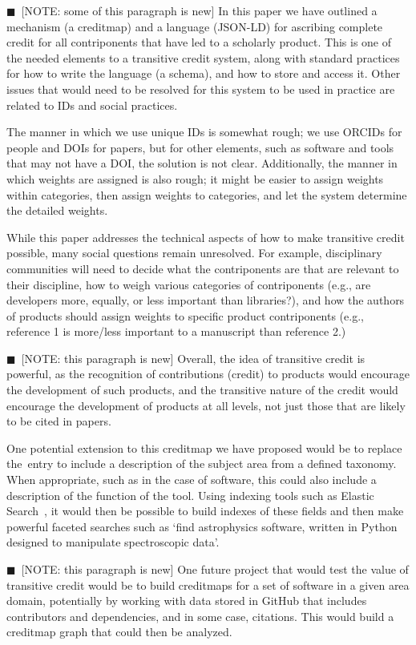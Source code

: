 \documentclass[a4paper,10pt]{article}
\newcommand{\note}[1]{{\color{darkgreen}$\blacksquare$~\textsf{[NOTE: #1]}}}
\begin{document}
\note{some of this paragraph is new}
In this paper we have outlined a mechanism (a creditmap) and a language (JSON-LD) for ascribing complete credit for all contriponents that have led to a scholarly product.
This is one of the needed elements to a transitive credit system, along with standard practices for
how  to write the language (a schema), and how to store and access it.  Other issues that would
need to be resolved for this system to be used in practice are related to IDs and social practices.

The manner in which we use unique IDs is somewhat rough; we use ORCIDs for people and DOIs for papers, but for other elements, such as software and tools that may not have a DOI, the solution is not clear.
Additionally, the manner in which weights are assigned is also rough; it might be easier to assign weights within categories, then assign weights to categories, and let the system determine the detailed weights.

While this paper addresses the technical aspects of how to make transitive credit possible, many social questions remain unresolved. For example, disciplinary communities will need to decide what the contriponents are that are relevant to their discipline, how to weigh various categories of contriponents (e.g., are developers more, equally, or less important than libraries?), and how the authors of products should assign weights to specific product contriponents (e.g., reference 1 is more/less important to a manuscript than reference 2.) 

\note{this paragraph is new} Overall, the idea of transitive credit is powerful, as the recognition of contributions (credit) to products would encourage the development of such products, and the transitive nature of the credit would encourage the development of products at all levels, not just those that are likely to be cited in papers. 

One potential extension to this creditmap we have proposed would be to replace the~\keywords entry to include a description of the subject area from a defined taxonomy. When appropriate, such as in the case of software, this could also include a description of the function of the tool. Using indexing tools such as Elastic Search~\cite{elasticsearch}, it would then be possible to build indexes of these fields and then make powerful faceted searches such as `find astrophysics software, written in Python designed to manipulate spectroscopic data'.

\note{this paragraph is new} One future project that would test the value of transitive credit would be to build creditmaps for a set of software in a given area domain, potentially by working with data stored in GitHub that includes contributors and dependencies, and in some case, citations.  This would build a creditmap graph that could then be analyzed.
\end{document}
